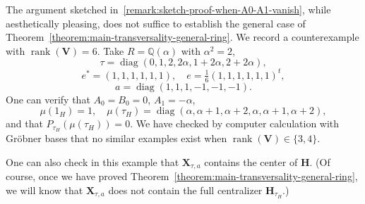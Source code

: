 \documentclass[reqno]{amsart}
\DeclareMathOperator{\diag}{diag}
\DeclareMathOperator{\rank}{rank}
\theoremstyle{plain} \newtheorem{theorem} {Theorem} \newtheorem{conjecture} {Conjecture} \newtheorem{corollary} [theorem] {Corollary} \newtheorem{proposition} [theorem] {Proposition} \newtheorem{fact} [theorem] {Fact}
\theoremstyle{definition} \newtheorem{definition} [theorem] {Definition}
\theoremstyle{itplain} %
\begin{document}
\begin{remark}\label{remark:gl6-example}
  The argument sketched in~\ref{remark:sketch-proof-when-A0-A1-vanish}, while aesthetically pleasing, does not suffice to establish the general case of Theorem~\ref{theorem:main-transversality-general-ring}.  We record a counterexample with $\rank(\mathbf{V}) = 6$.  Take $R = \mathbb{Q}(\alpha)$ with $\alpha^2 = 2$,
  \begin{equation*}
    \tau = \diag(0,1,2,2 \alpha,1 + 2 \alpha,2 + 2 \alpha),
  \end{equation*}
  \begin{equation*}
    e^* = (1,1,1,1,1,1), \quad e = \tfrac{1}{6} {(1,1,1,1,1,1)}^t,
  \end{equation*}
  \begin{equation*}
    a = \diag(1,1,1,-1,-1,-1).
  \end{equation*}
  One can verify that $A_0 =B_0= 0$, $A_1 = -\alpha$,
  \begin{equation*}
    \mu(1_H) = 1, \quad \mu(\tau_H) =
    \diag \left(
      \alpha, \alpha + 1, \alpha + 2, \alpha, \alpha + 1, \alpha + 2
    \right),
  \end{equation*}
  and that $P_{\tau_H}(\mu(\tau_H)) = 0$.  We have checked by computer calculation with Gr\"{o}bner bases that no similar examples exist when $\rank(\mathbf{V}) \in \{3,4\}$.

  One can also check in this example that $\mathbf{X}_{\tau,a}$ contains the center of $\mathbf{H}$.  (Of course, once we have proved Theorem~\ref{theorem:main-transversality-general-ring}, we will know that $\mathbf{X}_{\tau,a}$ does not contain the full centralizer $\mathbf{H}_{\tau_H}$.)
\end{remark}
\end{document}
